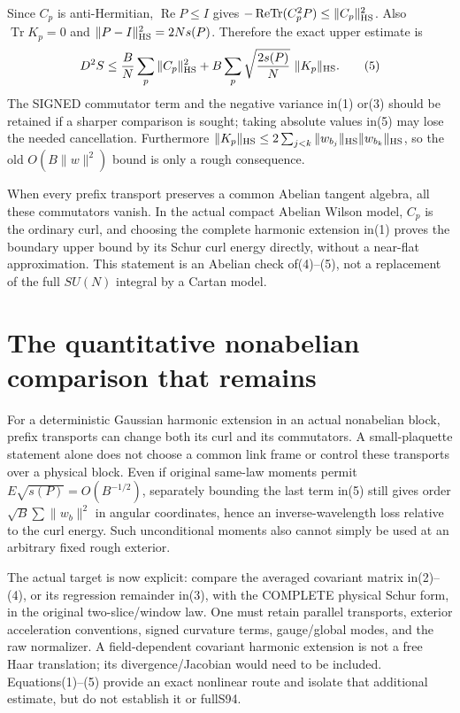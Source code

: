 \documentclass{article}
\begin{document}
Since $C_p$ is anti-Hermitian, $\operatorname{Re}P\le I$ gives
$-\operatorname{ReTr}(C_p^2P)\le\|C_p\|_{\rm HS}^2$.
Also $\operatorname{Tr}K_p=0$ and
$\|P-I\|_{\rm HS}^2=2N s(P)$. Therefore the exact upper estimate is
\[
 D^2S\le {B\over N}\sum_p\|C_p\|_{\rm HS}^2
       +B\sum_p\sqrt{{2s(P)\over N}}\ \|K_p\|_{\rm HS}. \tag{5}
\]
The SIGNED commutator term and the negative variance in(1) or(3) should be retained if a sharper comparison is sought; taking absolute values in(5) may lose the needed cancellation. Furthermore
$\|K_p\|_{\rm HS}\le2\sum_{j<k}\|w_{b_j}\|_{\rm HS}\|w_{b_k}\|_{\rm HS}$,
so the old $O(B\|w\|^2)$ bound is only a rough consequence.

When every prefix transport preserves a common Abelian tangent algebra, all these commutators vanish. In the actual compact Abelian Wilson model, $C_p$ is the ordinary curl, and choosing the complete harmonic extension in(1) proves the boundary upper bound by its Schur curl energy directly, without a near-flat approximation. This statement is an Abelian check of(4)--(5), not a replacement of the full $SU(N)$ integral by a Cartan model.

\section*{The quantitative nonabelian comparison that remains}
For a deterministic Gaussian harmonic extension in an actual nonabelian block, prefix transports can change both its curl and its commutators. A small-plaquette statement alone does not choose a common link frame or control these transports over a physical block. Even if original same-law moments permit $E\sqrt{s(P)}=O(B^{-1/2})$, separately bounding the last term in(5) still gives order $\sqrt B\sum\|w_b\|^2$ in angular coordinates, hence an inverse-wavelength loss relative to the curl energy. Such unconditional moments also cannot simply be used at an arbitrary fixed rough exterior.

The actual target is now explicit: compare the averaged covariant matrix in(2)--(4), or its regression remainder in(3), with the COMPLETE physical Schur form, in the original two-slice/window law. One must retain parallel transports, exterior acceleration conventions, signed curvature terms, gauge/global modes, and the raw normalizer. A field-dependent covariant harmonic extension is not a free Haar translation; its divergence/Jacobian would need to be included. Equations(1)--(5) provide an exact nonlinear route and isolate that additional estimate, but do not establish it or fullS94.
\end{document}
